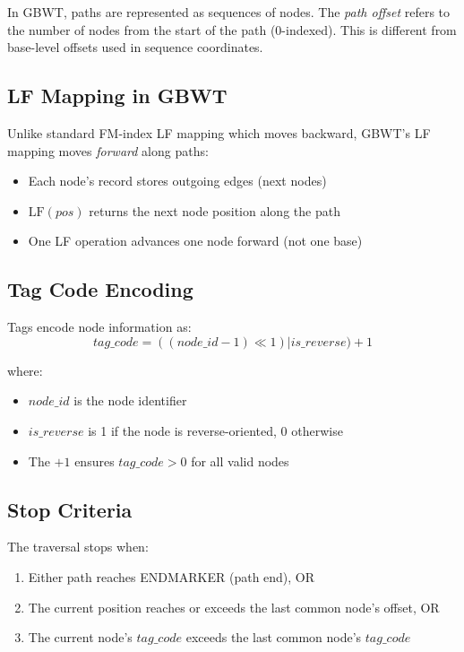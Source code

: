 \documentclass[11pt]{article}
\begin{document}
In GBWT, paths are represented as sequences of nodes. The \textit{path offset} refers to the number of nodes from the start of the path (0-indexed). This is different from base-level offsets used in sequence coordinates.

\subsection{LF Mapping in GBWT}

Unlike standard FM-index LF mapping which moves backward, GBWT's LF mapping moves \textit{forward} along paths:
\begin{itemize}
    \item Each node's record stores outgoing edges (next nodes)
    \item $\text{LF}(pos)$ returns the next node position along the path
    \item One LF operation advances one node forward (not one base)
\end{itemize}

\subsection{Tag Code Encoding}

Tags encode node information as:
\[
tag\_code = ((node\_id - 1) \ll 1) | is\_reverse) + 1
\]

where:
\begin{itemize}
    \item $node\_id$ is the node identifier
    \item $is\_reverse$ is 1 if the node is reverse-oriented, 0 otherwise
    \item The $+1$ ensures $tag\_code > 0$ for all valid nodes
\end{itemize}

\subsection{Stop Criteria}

The traversal stops when:
\begin{enumerate}
    \item Either path reaches ENDMARKER (path end), OR
    \item The current position reaches or exceeds the last common node's offset, OR
    \item The current node's $tag\_code$ exceeds the last common node's $tag\_code$
\end{enumerate}
\end{document}
